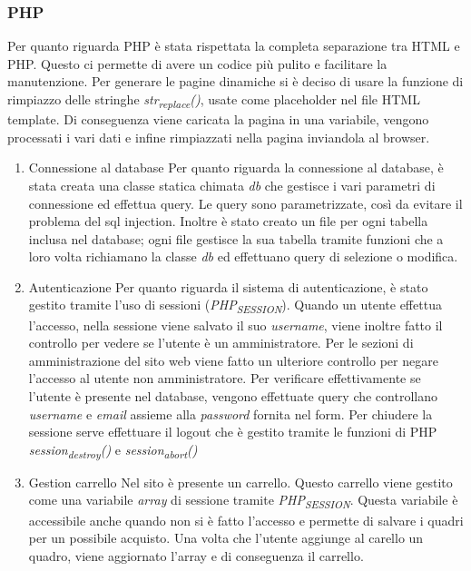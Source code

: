 \documentclass[11pt]{article}
\begin{document}
\subsubsection{PHP}
\label{sec:orge9b97b2}
Per quanto riguarda PHP è stata rispettata la completa separazione tra HTML e PHP. 
Questo ci permette di avere un codice più pulito e facilitare la manutenzione. 
Per generare le pagine dinamiche si è deciso di usare la funzione di rimpiazzo delle stringhe \emph{str\textsubscript{replace}()}, usate come placeholder nel file HTML template.
Di conseguenza viene caricata la pagina in una variabile, vengono processati i vari dati e infine rimpiazzati nella pagina inviandola al browser.
\begin{enumerate}
\item Connessione al database
\label{sec:orgb525dda}
Per quanto riguarda la connessione al database, è stata creata una classe statica chimata \emph{db} che gestisce i vari parametri di connessione ed effettua query. 
Le query sono parametrizzate, così da evitare il problema del sql injection. Inoltre è stato creato un file per ogni tabella inclusa nel database; 
ogni file gestisce la sua tabella tramite funzioni che a loro volta richiamano la classe \emph{db} ed effettuano query di selezione o modifica.
\item Autenticazione
\label{sec:orgc6af317}
Per quanto riguarda il sistema di autenticazione, è stato gestito tramite l'uso di sessioni (\emph{PHP\textsubscript{SESSION}}).
Quando un utente effettua l'accesso, nella sessione viene salvato il suo \emph{username}, viene inoltre fatto il controllo per vedere se l'utente è un amministratore.
Per le sezioni di amministrazione del sito web viene fatto un ulteriore controllo per negare l'accesso al utente non amministratore. Per verificare effettivamente se 
l'utente è presente nel database, vengono effettuate query che controllano \emph{username} e \emph{email} assieme alla \emph{password} fornita nel form.
Per chiudere la sessione serve effettuare il logout che è gestito tramite le funzioni di PHP \emph{session\textsubscript{destroy}()} e \emph{session\textsubscript{abort}()}
\item Gestion carrello
\label{sec:orgfb385d7}
Nel sito è presente un carrello. Questo carrello viene gestito come una variabile \emph{array} di sessione tramite \emph{PHP\textsubscript{SESSION}}. Questa variabile è accessibile anche quando non si è fatto l'accesso
e permette di salvare i quadri per un possibile acquisto. Una volta che l'utente aggiunge al carello un quadro, viene aggiornato l'array e di conseguenza il carrello.

\end{enumerate}
\end{document}
